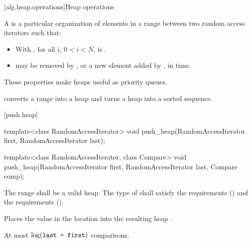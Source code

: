 [alg.heap.operations]{Heap operations}

\pnum
A
is a particular organization of elements in a range between two random access iterators
 such that:

\begin{itemize}
\item With , for all $i$, $0 < i < N$,
is .
\item {}
may be removed by
,
or a new element added by
,
in
time.
\end{itemize}

\pnum
These properties make heaps useful as priority queues.

\pnum
{}
converts a range into a heap and
turns a heap into a sorted sequence.

[push.heap]{}

%
\begin{itemdecl}
template<class RandomAccessIterator>
  void push_heap(RandomAccessIterator first, RandomAccessIterator last);

template<class RandomAccessIterator, class Compare>
  void push_heap(RandomAccessIterator first, RandomAccessIterator last,
                 Compare comp);
\end{itemdecl}

\begin{itemdescr}
\pnum
\requires
The range
shall be a valid heap.
The type of  shall satisfy
the  requirements
() and the
 requirements
().

\pnum
\effects
Places the value in the location
into the resulting heap
.

\pnum
\complexity
At most
$\log(\texttt{last - first})$
comparisons.
\end{itemdescr}

